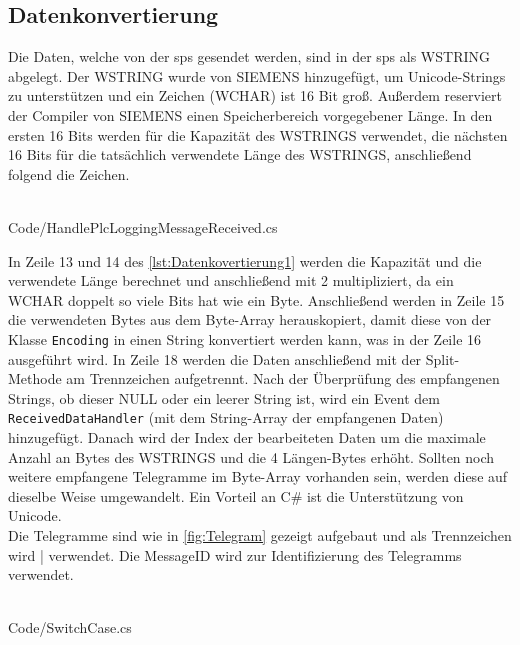 \subsection{Datenkonvertierung} 
Die Daten, welche von der \ac{sps} gesendet werden, sind in der \ac{sps} als \glqq WSTRING\grqq{} abgelegt. Der WSTRING wurde von SIEMENS hinzugefügt, um Unicode-Strings zu unterstützen und ein Zeichen (WCHAR) ist 16 Bit groß. Außerdem reserviert der Compiler von SIEMENS einen Speicherbereich vorgegebener Länge. In den ersten 16 Bits werden für die Kapazität des WSTRINGS verwendet, die nächsten 16 Bits für die tatsächlich verwendete Länge des WSTRINGS, anschließend folgend die Zeichen.
\ \\
\begin{minipage}{\textwidth}
\ \\
 {Code/HandlePlcLoggingMessageReceived.cs}
\ \\
\end{minipage}
In Zeile 13 und 14 des \autoref{lst:Datenkovertierung1} werden die Kapazität und die verwendete Länge berechnet und anschließend mit 2 multipliziert, da ein WCHAR doppelt so viele Bits hat wie ein Byte. Anschließend werden in Zeile 15 die verwendeten Bytes aus dem Byte-Array herauskopiert, damit diese von der Klasse \texttt{Encoding} in einen String konvertiert werden kann, was in der Zeile 16 ausgeführt wird. In Zeile 18 werden die Daten anschließend mit der Split-Methode am Trennzeichen aufgetrennt.
Nach der Überprüfung des empfangenen Strings, ob dieser NULL oder ein leerer String ist, wird ein Event dem \texttt{ReceivedDataHandler} (mit dem String-Array der empfangenen Daten) hinzugefügt. 
Danach wird der Index der bearbeiteten Daten um die maximale Anzahl an Bytes des WSTRINGS und die 4 Längen-Bytes erhöht. Sollten noch weitere empfangene Telegramme im Byte-Array vorhanden sein, werden diese auf dieselbe Weise umgewandelt. 
Ein Vorteil an C\# ist die Unterstützung von Unicode.
\ \\
Die Telegramme sind wie in \autoref{fig:Telegram} gezeigt aufgebaut und als Trennzeichen wird \glqq |\grqq{} verwendet. Die \glqq MessageID\grqq{} wird zur Identifizierung des Telegramms verwendet. 
\ \\
\begin{minipage}{\textwidth}
\ \\
 {Code/SwitchCase.cs}
\ \\
\end{minipage}
